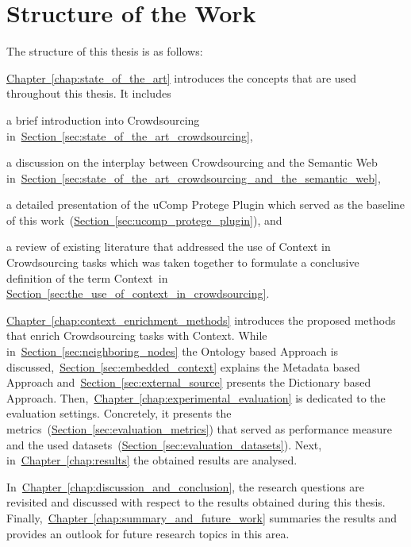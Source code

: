 \section{Structure of the Work}
The structure of this thesis is as follows:

\hyperref[chap:state_of_the_art]{Chapter~\ref*{chap:state_of_the_art}} introduces the concepts that are used throughout this thesis. It includes
\begin{inparaenum}[i)]
		\item a brief introduction into Crowdsourcing in~\hyperref[sec:state_of_the_art_crowdsourcing]{Section~\ref*{sec:state_of_the_art_crowdsourcing}},
		\item a discussion on the interplay between Crowdsourcing and the Semantic Web in~\hyperref[sec:state_of_the_art_crowdsourcing_and_the_semantic_web]{Section~\ref*{sec:state_of_the_art_crowdsourcing_and_the_semantic_web}},
		\item a detailed presentation of the uComp Protege Plugin which served as the baseline of this work~(\hyperref[sec:ucomp_protege_plugin]{Section~\ref*{sec:ucomp_protege_plugin}}), and 
		\item a review of existing literature that addressed the use of Context in Crowdsourcing tasks which was taken together to formulate a conclusive definition of the term \guillemotright Context\guillemotleft~in \hyperref[sec:the_use_of_context_in_crowdsourcing]{Section~\ref*{sec:the_use_of_context_in_crowdsourcing}}.
\end{inparaenum}

\hyperref[chap:context_enrichment_methods]{Chapter~\ref*{chap:context_enrichment_methods}} introduces the proposed methods that enrich Crowdsourcing tasks with Context. While in~\hyperref[sec:neighboring_nodes]{Section~\ref*{sec:neighboring_nodes}} the Ontology based Approach is discussed,~\hyperref[sec:embedded_context]{Section~\ref*{sec:embedded_context}} explains the Metadata based Approach and~\hyperref[sec:external_source]{Section~\ref*{sec:external_source}} presents the Dictionary based Approach. Then,~\hyperref[chap:experimental_evaluation]{Chapter~\ref*{chap:experimental_evaluation}} is dedicated to the evaluation settings. Concretely, it presents the metrics~(\hyperref[sec:evaluation_metrics]{Section~\ref*{sec:evaluation_metrics}}) that served as performance measure and the used
datasets~(\hyperref[sec:evaluation_datasets]{Section~\ref*{sec:evaluation_datasets}}).
Next, in~\hyperref[chap:results]{Chapter~\ref*{chap:results}} the obtained results are analysed.

In~\hyperref[chap:discussion_and_conclusion]{Chapter~\ref*{chap:discussion_and_conclusion}}, the research questions are revisited and discussed
with respect to the results obtained during this thesis. Finally,~\hyperref[chap:summary_and_future_work]{Chapter~\ref*{chap:summary_and_future_work}}
summaries the results and provides an outlook for future research topics in this area.

